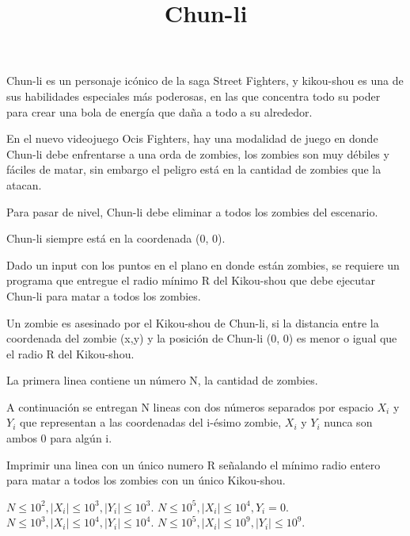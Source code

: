 \documentclass{oci}
\title{Chun-li}
\begin{document}
\begin{problemDescription}
Chun-li es un personaje icónico de la saga Street Fighters, y kikou-shou es una de sus habilidades especiales más poderosas, en las que concentra todo su poder para crear una bola de energía que daña a todo a su alrededor.

En el nuevo videojuego Ocis Fighters, hay una modalidad de juego en donde Chun-li debe enfrentarse a una orda de zombies, los zombies son muy débiles y fáciles de matar, sin embargo el peligro está en la cantidad de zombies que la atacan.

Para pasar de nivel, Chun-li debe eliminar a todos los zombies del escenario.

Chun-li siempre está en la coordenada (0, 0).

Dado un input con los puntos en el plano en donde están zombies, se requiere un programa que entregue el radio mínimo R del Kikou-shou que debe ejecutar Chun-li para matar a todos los zombies.

Un zombie es asesinado por el Kikou-shou de Chun-li, si la distancia entre la coordenada del zombie (x,y) y la posición de Chun-li (0, 0) es menor o igual que el radio R del Kikou-shou.

\end{problemDescription}

\begin{inputDescription}
La primera linea contiene un número N, la cantidad de zombies.

A continuación se entregan N lineas con dos números separados por espacio $X_i$ y $Y_i$ que representan a las coordenadas del i-ésimo zombie, $X_i$ y $Y_i$ nunca son ambos 0 para algún i.

\end{inputDescription}

\begin{outputDescription}

Imprimir una linea con un único numero R señalando el mínimo radio entero para matar a todos los zombies con un único Kikou-shou.

\end{outputDescription}

\begin{scoreDescription}
 $N \leq 10^2, \left | X_i \right | \leq 10^3,  \left | Y_i \right | \leq 10^3$.
 $N \leq 10^5, \left | X_i \right | \leq 10^4,  Y_i = 0$.
 $N \leq 10^3, \left | X_i \right | \leq 10^4,  \left | Y_i \right | \leq 10^4$.
 $N \leq 10^5, \left | X_i \right | \leq 10^9,  \left | Y_i \right | \leq 10^9$.
\end{scoreDescription}

\begin{sampleDescription}
\end{sampleDescription}
\end{document}
